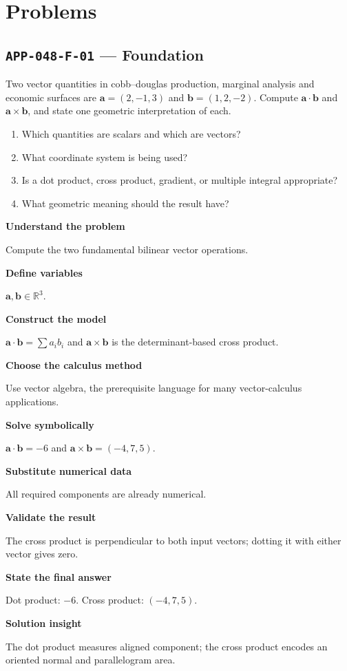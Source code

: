 \documentclass[11pt]{book}
\newcommand{\pid}[1]{\texttt{#1}}
\begin{document}
\section*{Problems}
\subsection*{\pid{APP-048-F-01} — Foundation}
\begin{problembox}
Two vector quantities in cobb–douglas production, marginal analysis and economic surfaces are $\mathbf a=(2,-1,3)$ and $\mathbf b=(1,2,-2)$. Compute $\mathbf a\cdot\mathbf b$ and $\mathbf a\times\mathbf b$, and state one geometric interpretation of each.
\end{problembox}
\begin{promptbox}\begin{enumerate}
\item Which quantities are scalars and which are vectors?
\item What coordinate system is being used?
\item Is a dot product, cross product, gradient, or multiple integral appropriate?
\item What geometric meaning should the result have?
\end{enumerate}\end{promptbox}
\begin{solutionbox}
\textbf{Understand the problem}\par Compute the two fundamental bilinear vector operations.\par\medskip
\textbf{Define variables}\par $\mathbf a,\mathbf b\in\mathbb R^3$.\par\medskip
\textbf{Construct the model}\par $\mathbf a\cdot\mathbf b=\sum a_ib_i$ and $\mathbf a\times\mathbf b$ is the determinant-based cross product.\par\medskip
\textbf{Choose the calculus method}\par Use vector algebra, the prerequisite language for many vector-calculus applications.\par\medskip
\textbf{Solve symbolically}\par $\mathbf a\cdot\mathbf b=-6$ and $\mathbf a\times\mathbf b=(-4,7,5)$.\par\medskip
\textbf{Substitute numerical data}\par All required components are already numerical.\par\medskip
\textbf{Validate the result}\par The cross product is perpendicular to both input vectors; dotting it with either vector gives zero.\par\medskip
\textbf{State the final answer}\par Dot product: $-6$. Cross product: $(-4,7,5)$.\par\medskip
\textbf{Solution insight}\par The dot product measures aligned component; the cross product encodes an oriented normal and parallelogram area.\par\medskip
\end{solutionbox}
\end{document}
